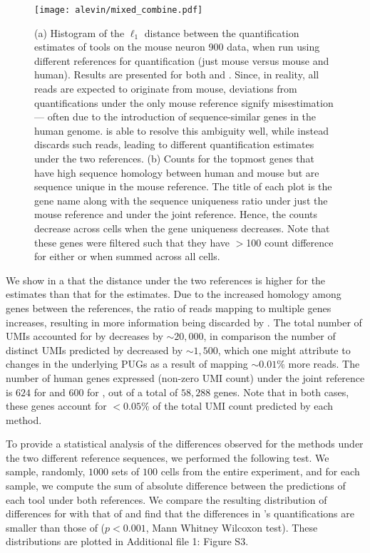   \begin{figure}
      \centering
    \texttt{[image: alevin/mixed\_combine.pdf]}
    \caption{(a) Histogram of the $\ell_{1}$ distance between the
        quantification estimates of tools on the mouse neuron 900 data, when run
        using different references for quantification (just mouse versus mouse and
        human). Results are presented for both \alevin and \cellr. Since, in
        reality, all reads are expected to originate from mouse, deviations from
        quantifications under the only mouse reference signify misestimation ---
        often due to the introduction of sequence-similar genes in the human
        genome. \Alevin is able to resolve this ambiguity well, while \cellr
        instead discards such reads, leading to different quantification estimates
        under the two references. (b) Counts for the topmost genes that have high sequence homology between human 
        and mouse but are sequence unique in the mouse reference. The title of each plot is the gene name 
        along with the sequence uniqueness ratio under just the mouse reference and under the joint reference. Hence, the
        \cellr counts decrease across cells when the gene uniqueness decreases. Note that these genes were filtered such
        that they have $>$100 count difference for either \alevin or \cellr when summed across all cells. }
    \label{fig:mixedanalysis}
  \end{figure}
  
  We show in a that the distance under
  the two references is higher for the \cellr estimates than that for the
  \alevin estimates. Due to the increased homology among genes between the
  references, the ratio of reads mapping to multiple genes increases, resulting
  in more information being discarded by \cellr. The total number of UMIs
  accounted for by \cellr decreases by $\sim20,000$, in comparison the number of
  distinct UMIs predicted by \alevin decreased by $\sim1,500$, which one might
  attribute to changes in the underlying PUGs as a result of mapping
  $\sim0.01\%$ more reads. The number of human genes expressed (non-zero UMI count)
  under the joint reference is $624$ for \cellr and $600$ for \alevin, out of a total of $58,288$ genes. 
  Note that in both cases, these genes account for $<0.05\%$ of the total UMI count predicted by each 
  method.

  To provide a statistical analysis of the differences observed for the methods
  under the two different reference sequences, we performed the following test.
  We sample, randomly, $1000$ sets of $100$ cells from the entire experiment,
  and for each sample, we compute the sum of absolute difference between the
  predictions of each tool under both references. We compare the resulting
  distribution of differences for \cellr with that of \alevin and find that the
  differences in \alevin's quantifications are smaller than those of \cellr ($p < 0.001$, Mann Whitney Wilcoxon test). 
  These distributions are plotted in Additional file 1: Figure S3.

